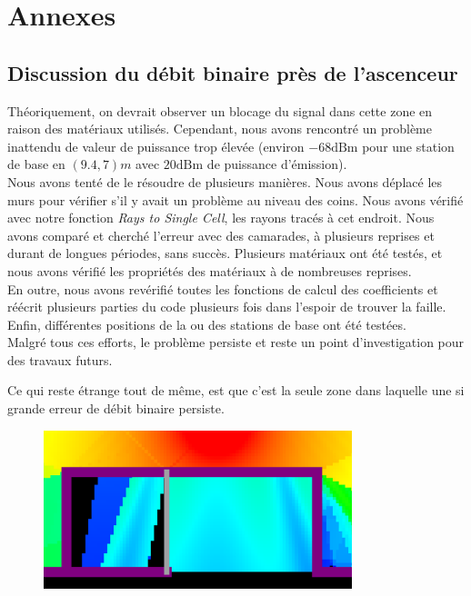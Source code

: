 \appendix
\chapter*{Annexes}
\renewcommand{\thesection}{\Alph{section}}
\section{Discussion du débit binaire près de l'ascenceur}
\label{discussion-debit-critique}
Th{\'e}oriquement, on devrait observer un blocage du signal dans cette
zone en raison des mat{\'e}riaux utilis{\'e}s. 
Cependant, nous avons
rencontr{\'e} un probl{\`e}me inattendu de valeur de puissance trop
{\'e}lev{\'e}e (environ $- 68 \mathrm{dBm}$ pour une station de base en $(9.4,
7) m$ avec $20 \mathrm{dBm}$ de puissance d'{\'e}mission).\\

Nous avons tent{\'e} de le
r{\'e}soudre de plusieurs mani{\`e}res. 
Nous avons d{\'e}plac{\'e} les murs
pour v{\'e}rifier s'il y avait un probl{\`e}me au niveau des coins. 
Nous avons
v{\'e}rifi{\'e} avec notre fonction \textit{Rays to Single Cell}, les rayons
trac{\'e}s {\`a} cet endroit. Nous avons compar{\'e} et cherch{\'e} l'erreur
avec des camarades, {\`a} plusieurs reprises et durant de longues périodes, sans
succ{\`e}s. Plusieurs mat{\'e}riaux ont {\'e}t{\'e} test{\'e}s, et nous avons
v{\'e}rifi{\'e} les propri{\'e}t{\'e}s des matériaux {\`a} de nombreuses
reprises. 
\\
En outre, nous avons rev{\'e}rifi{\'e} toutes les fonctions de
calcul des coefficients et r{\'e}{\'e}crit plusieurs parties du code plusieurs
fois dans l'espoir de trouver la faille. Enfin, diff{\'e}rentes positions de
la ou des stations de base ont {\'e}t{\'e} test{\'e}es.
\\ 
Malgr{\'e} tous ces efforts, le probl{\`e}me persiste et reste un point
d'investigation pour des travaux futurs. 


Ce qui reste {\'e}trange tout de même, est que
c'est la seule zone dans laquelle une si grande erreur de d{\'e}bit binaire
persiste. 

\begin{figure}[H]
    \centering
    \includegraphics[width=0.8\textwidth]{latex/images/bug-ascenseur.png}
    \label{fig:bug-ascenseur}
\end{figure}

